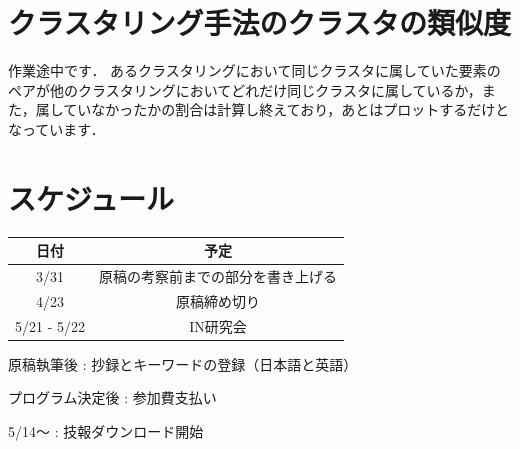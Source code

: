 \documentclass[a4j]{jarticle}
\begin{document}
\section{クラスタリング手法のクラスタの類似度}
作業途中です．
あるクラスタリングにおいて同じクラスタに属していた要素のペアが他のクラスタリングにおいてどれだけ同じクラスタに属しているか，また，属していなかったかの割合は計算し終えており，あとはプロットするだけとなっています．
\section{スケジュール}
\begin{table}[H]
\begin{tabular}{|c|c|}
\hline
日付&予定\\
\hline
3/31&原稿の考察前までの部分を書き上げる\\
\hline
4/23&原稿締め切り\\
\hline
5/21 - 5/22&IN研究会\\
\hline
\end{tabular}
\end{table}
原稿執筆後 : 抄録とキーワードの登録（日本語と英語）

プログラム決定後 : 参加費支払い

5/14～ : 技報ダウンロード開始
\end{document}
